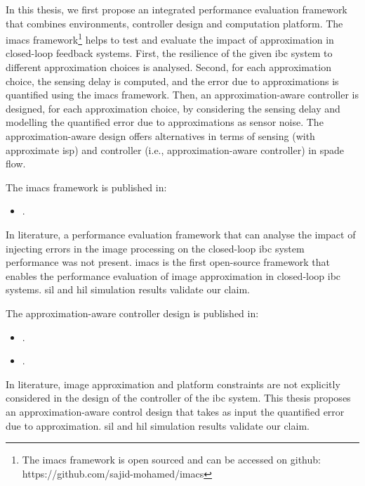 In this thesis, we first propose an integrated performance evaluation framework that combines environments, controller design and computation platform. The \gls{imacs} framework\footnote{The \gls{imacs} framework is open sourced and can be accessed on github: https://github.com/sajid-mohamed/imacs} helps to test and evaluate the impact of approximation in closed-loop feedback systems.
First, the resilience of the given \gls{ibc} system to different approximation choices is analysed. Second, for each approximation choice, the sensing delay is computed, and the error due to approximations is quantified using the \gls{imacs} framework.
Then, an approximation-aware controller is designed, for each approximation choice, by considering the sensing delay and modelling the quantified error due to approximations as sensor noise. The approximation-aware design offers alternatives in terms of sensing (with approximate \gls{isp}) and controller (i.e., approximation-aware controller) in \gls{spade} flow.

\sloppypar
The \gls{imacs} framework is published in:
\begin{itemize}
    \item {}.
\end{itemize}
In literature, a performance evaluation framework that can analyse the impact of injecting errors in the image processing on the closed-loop \gls{ibc} system performance was not present. \Gls{imacs} is the first open-source framework that enables the performance evaluation of image approximation in closed-loop \gls{ibc} systems. \gls{sil} and \gls{hil} simulation results validate our claim.

The approximation-aware controller design is published in:
\begin{itemize}
    \item {}.
    \item {}.
\end{itemize}
In literature, image approximation and platform constraints are not explicitly considered in the design of the controller of the \gls{ibc} system. 
This thesis proposes an approximation-aware control design that takes as input the quantified error due to approximation. \gls{sil} and \gls{hil} simulation results validate our claim.